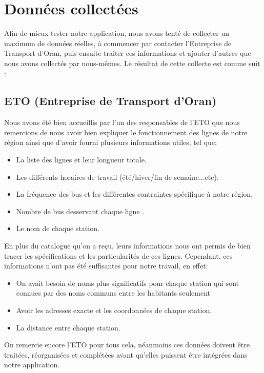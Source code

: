 \section{Données collectées}
Afin de mieux tester notre application, nous avons tenté de collecter un maximum de données réelles, à commencer par contacter l'Entreprise de Transport d'Oran, puis ensuite traiter ces informations et ajouter d'autres que nous avons collectés par nous-mêmes.
Le résultat de cette collecte est comme suit :

\subsection{ETO (Entreprise de Transport d'Oran)}

Nous avons été bien accueillis par l'un des responsables de l'ETO que nous remercions de nous avoir bien expliquer le fonctionnement des lignes de notre région ainsi que d'avoir fourni plusieurs informations utiles, tel que:
\begin{itemize}
	\item La liste des lignes et leur longueur totale.
	\item Les différents horaires de travail (été/hiver/fin de semaine...etc).
	\item La fréquence des bus et les différentes contraintes spécifique à notre région.
	\item Nombre de bus desservant chaque ligne .
	\item Le nom de chaque station.
\end{itemize}

En plus du catalogue qu'on a reçu, leurs informations nous ont permis de bien tracer les spécifications et les particularités de ces lignes.
Cependant, ces informations n'ont pas été suffisantes pour notre travail, en effet:
	\begin{itemize}
	\item On avait besoin de noms plus significatifs pour chaque station qui sont connues par des noms communs entre les habitants seulement
	\item Avoir les adresses exacte et les coordonnées de chaque station.
	\item La distance entre chaque station.
	\end{itemize}
	
On remercie encore l'ETO pour tous cela, néanmoins  ces données doivent être traitées, réorganisées et complétées avant qu'elles puissent être intégrées dans notre application.  

